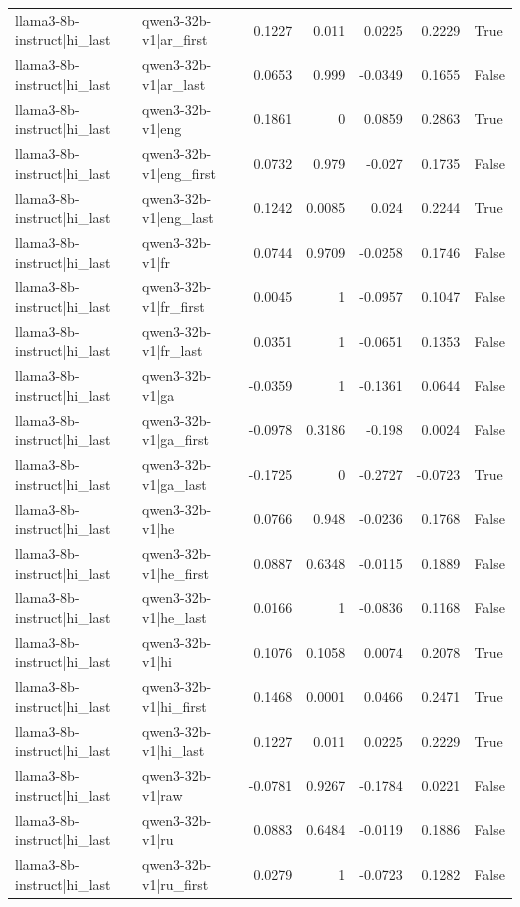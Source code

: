 \begin{table}
\begin{tabular}{l l r r r r l}
llama3-8b-instruct|hi_last & qwen3-32b-v1|ar_first & 0.1227 & 0.011 & 0.0225 & 0.2229 & True \\
llama3-8b-instruct|hi_last & qwen3-32b-v1|ar_last & 0.0653 & 0.999 & -0.0349 & 0.1655 & False \\
llama3-8b-instruct|hi_last & qwen3-32b-v1|eng & 0.1861 & 0 & 0.0859 & 0.2863 & True \\
llama3-8b-instruct|hi_last & qwen3-32b-v1|eng_first & 0.0732 & 0.979 & -0.027 & 0.1735 & False \\
llama3-8b-instruct|hi_last & qwen3-32b-v1|eng_last & 0.1242 & 0.0085 & 0.024 & 0.2244 & True \\
llama3-8b-instruct|hi_last & qwen3-32b-v1|fr & 0.0744 & 0.9709 & -0.0258 & 0.1746 & False \\
llama3-8b-instruct|hi_last & qwen3-32b-v1|fr_first & 0.0045 & 1 & -0.0957 & 0.1047 & False \\
llama3-8b-instruct|hi_last & qwen3-32b-v1|fr_last & 0.0351 & 1 & -0.0651 & 0.1353 & False \\
llama3-8b-instruct|hi_last & qwen3-32b-v1|ga & -0.0359 & 1 & -0.1361 & 0.0644 & False \\
llama3-8b-instruct|hi_last & qwen3-32b-v1|ga_first & -0.0978 & 0.3186 & -0.198 & 0.0024 & False \\
llama3-8b-instruct|hi_last & qwen3-32b-v1|ga_last & -0.1725 & 0 & -0.2727 & -0.0723 & True \\
llama3-8b-instruct|hi_last & qwen3-32b-v1|he & 0.0766 & 0.948 & -0.0236 & 0.1768 & False \\
llama3-8b-instruct|hi_last & qwen3-32b-v1|he_first & 0.0887 & 0.6348 & -0.0115 & 0.1889 & False \\
llama3-8b-instruct|hi_last & qwen3-32b-v1|he_last & 0.0166 & 1 & -0.0836 & 0.1168 & False \\
llama3-8b-instruct|hi_last & qwen3-32b-v1|hi & 0.1076 & 0.1058 & 0.0074 & 0.2078 & True \\
llama3-8b-instruct|hi_last & qwen3-32b-v1|hi_first & 0.1468 & 0.0001 & 0.0466 & 0.2471 & True \\
llama3-8b-instruct|hi_last & qwen3-32b-v1|hi_last & 0.1227 & 0.011 & 0.0225 & 0.2229 & True \\
llama3-8b-instruct|hi_last & qwen3-32b-v1|raw & -0.0781 & 0.9267 & -0.1784 & 0.0221 & False \\
llama3-8b-instruct|hi_last & qwen3-32b-v1|ru & 0.0883 & 0.6484 & -0.0119 & 0.1886 & False \\
llama3-8b-instruct|hi_last & qwen3-32b-v1|ru_first & 0.0279 & 1 & -0.0723 & 0.1282 & False \\

\end{tabular}
\end{table}
